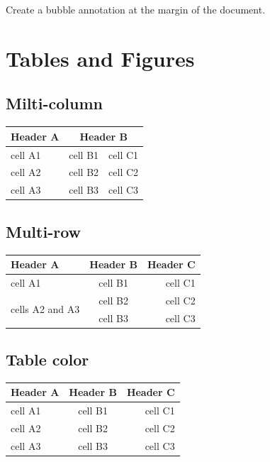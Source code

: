 \documentclass[12pt,letterpaper]{article}
\begin{document}
Create a bubble annotation at the margin of the document.


\section{Tables and Figures}

\subsection{Milti-column}

\begin{tabular}{|l|c|r|} 
\hline
\textbf{Header A} & \multicolumn{2}{|c|}{\textbf{Header B}} \\ 
\hline\hline
cell A1  &  cell B1  &  cell C1 \\
cell A2  &  cell B2  &  cell C2 \\
cell A3  &  cell B3  &  cell C3 \\ \hline
\end{tabular}


\subsection{Multi-row}


\begin{tabular}{|l|c|r|} 
\hline
\textbf{Header A} & \textbf{Header B} & \textbf{Header C} \\ 
\hline\hline
cell A1  &  cell B1  &  cell C1 \\ \hline
\multirow{2}{*}{cells A2 and A3}  &  cell B2  &  cell C2 \\ \cline{2-3}
       &  cell B3  &  cell C3 \\ \hline
\end{tabular}


\subsection{Table color}

\begin{tabular}{|l|c|r|} 
\hline
\cellcolor{lightgray}\textbf{Header A} & \cellcolor{lightgray}\textbf{Header B} & \cellcolor{lightgray}\textbf{Header C} \\ 
\hline\hline
\cellcolor{blue!25}cell A1  &  cell B1  &  cell C1 \\
\cellcolor{blue!50}cell A2  &  cell B2  &  cell C2 \\
\cellcolor{blue!75}cell A3  &  cell B3  &  cell C3 \\ \hline
\end{tabular}
\end{document}
